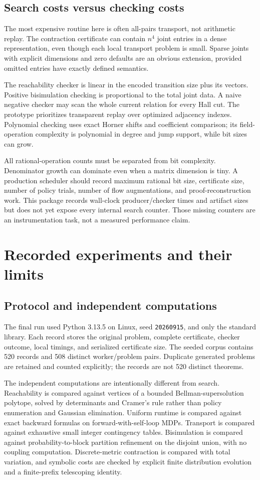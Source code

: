 \documentclass[11pt,letterpaper]{article}
\theoremstyle{definition}\newtheorem{definition}[theorem]{Definition}
\theoremstyle{remark}\newtheorem{remark}[theorem]{Remark}
\newcommand{\code}[1]{\texttt{#1}}
\begin{document}
\subsection{Search costs versus checking costs}
The most expensive routine here is often all-pairs transport, not arithmetic replay. The contraction certificate can contain $n^4$ joint entries in a dense representation, even though each local transport problem is small. Sparse joints with explicit dimensions and zero defaults are an obvious extension, provided omitted entries have exactly defined semantics.

The reachability checker is linear in the encoded transition size plus its vectors. Positive bisimulation checking is proportional to the total joint data. A naive negative checker may scan the whole current relation for every Hall cut. The prototype prioritizes transparent replay over optimized adjacency indexes. Polynomial checking uses exact Horner shifts and coefficient comparison; its field-operation complexity is polynomial in degree and jump support, while bit sizes can grow.

All rational-operation counts must be separated from bit complexity. Denominator growth can dominate even when a matrix dimension is tiny. A production scheduler should record maximum rational bit size, certificate size, number of policy trials, number of flow augmentations, and proof-reconstruction work. This package records wall-clock producer/checker times and artifact sizes but does not yet expose every internal search counter. Those missing counters are an instrumentation task, not a measured performance claim.

\section{Recorded experiments and their limits}
\subsection{Protocol and independent computations}
The final run used Python 3.13.5 on Linux, seed \code{20260915}, and only the standard library. Each record stores the original problem, complete certificate, checker outcome, local timings, and serialized certificate size. The seeded corpus contains 520 records and 508 distinct worker/problem pairs. Duplicate generated problems are retained and counted explicitly; the records are not 520 distinct theorems.

The independent computations are intentionally different from search. Reachability is compared against vertices of a bounded Bellman-supersolution polytope, solved by determinants and Cramer's rule rather than policy enumeration and Gaussian elimination. Uniform runtime is compared against exact backward formulas on forward-with-self-loop MDPs. Transport is compared against exhaustive small integer contingency tables. Bisimulation is compared against probability-to-block partition refinement on the disjoint union, with no coupling computation. Discrete-metric contraction is compared with total variation, and symbolic costs are checked by explicit finite distribution evolution and a finite-prefix telescoping identity.
\end{document}
